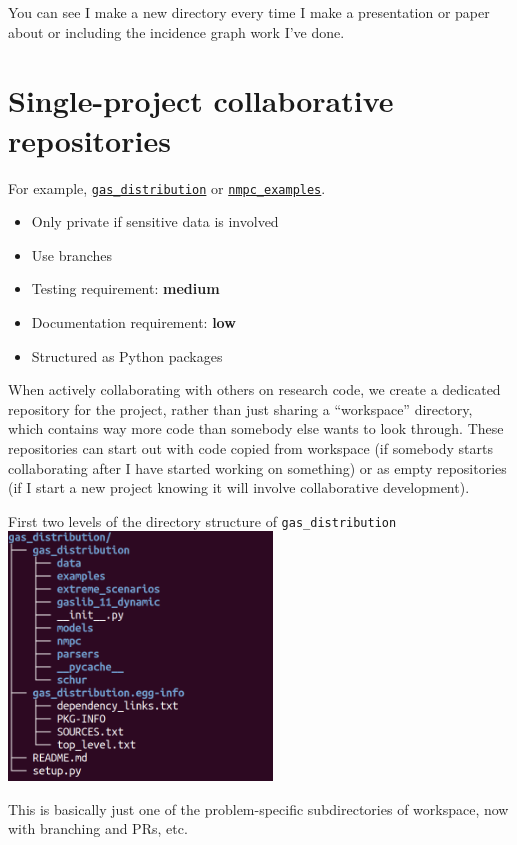 \documentclass{article}
\begin{document}
You can see I make a new directory every time I make a presentation or
paper about or including the incidence graph work I've done.

\section{Single-project collaborative repositories}
For example,
\href{https://github.com/Robbybp/gas_distribution}{\texttt{gas\_distribution}}
or
\href{https://github.com/robbybp/nmpc_examples}{\texttt{nmpc\_examples}}.
\begin{itemize}
  \item Only private if sensitive data is involved
  \item Use branches
  \item Testing requirement: {\color{purple}\bf medium}
  \item Documentation requirement: {\color{blue}\bf low}
  \item Structured as Python packages
\end{itemize}
When actively collaborating with others on research code, we create
a dedicated repository for the project, rather than just sharing a
``workspace'' directory, which contains way more code than somebody else
wants to look through.
These repositories can start out with code copied from workspace
(if somebody starts collaborating after I have started working on something)
or as empty repositories (if I start a new project knowing it will
involve collaborative development).

\begin{center}
  First two levels of the directory structure of \texttt{gas\_distribution}
  \includegraphics[width=7cm]{gas_distribution_tree.png}
\end{center}

This is basically just one of the problem-specific subdirectories of
workspace, now with branching and PRs, etc.
\end{document}
